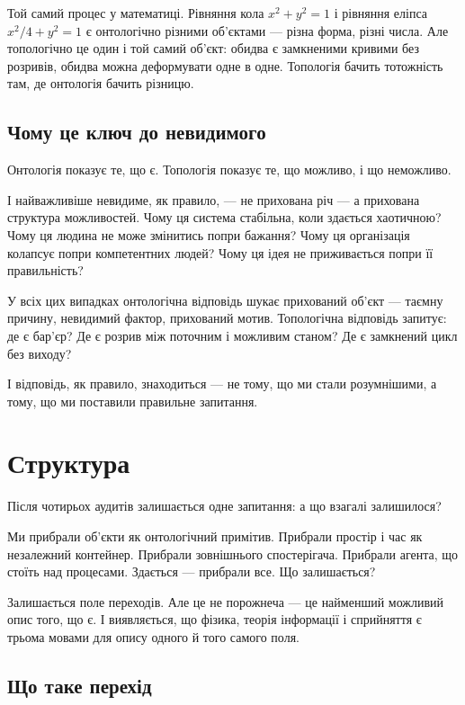 \documentclass[12pt, a4paper, openany]{book}
\begin{document}
\begin{analogybox}
Той самий процес у математиці. Рівняння кола $x^2 + y^2 = 1$ і рівняння еліпса $x^2/4 + y^2 = 1$ є онтологічно різними об'єктами --- різна форма, різні числа. Але топологічно це один і той самий об'єкт: обидва є замкненими кривими без розривів, обидва можна деформувати одне в одне. Топологія бачить тотожність там, де онтологія бачить різницю.
\end{analogybox}

\section{Чому це ключ до невидимого}

Онтологія показує те, що є. Топологія показує те, що можливо, і що неможливо.

І найважливіше невидиме, як правило, — не прихована річ --- а прихована структура можливостей. Чому ця система стабільна, коли здається хаотичною? Чому ця людина не може змінитись попри бажання? Чому ця організація колапсує попри компетентних людей? Чому ця ідея не приживається попри її правильність?

У всіх цих випадках онтологічна відповідь шукає прихований об'єкт --- таємну причину, невидимий фактор, прихований мотив. Топологічна відповідь запитує: де є бар'єр? Де є розрив між поточним і можливим станом? Де є замкнений цикл без виходу?

І відповідь, як правило, знаходиться --- не тому, що ми стали розумнішими, а тому, що ми поставили правильне запитання.

\chapter{Структура}

Після чотирьох аудитів залишається одне запитання: а що взагалі залишилося?

Ми прибрали об'єкти як онтологічний примітив. Прибрали простір і час як незалежний контейнер. Прибрали зовнішнього спостерігача. Прибрали агента, що стоїть над процесами. Здається --- прибрали все. Що залишається?

Залишається поле переходів. Але це не порожнеча --- це найменший можливий опис того, що є. І виявляється, що фізика, теорія інформації і сприйняття є трьома мовами для опису одного й того самого поля.

\section{Що таке перехід}
\end{document}
